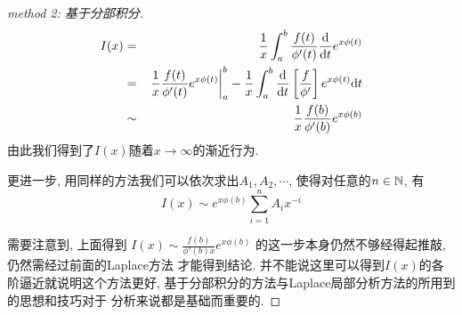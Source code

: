 \documentclass[a4paper,12pt]{article}
\begin{document}
  \begin{proof}[method 2: 基于分部积分]
    \begin{eqnarray*}
      I(x)&=&\frac{1}{x}\int_a^b\frac{f(t)}{\phi'(t)}\frac{\mathrm{d}}{\mathrm{d} t}e^{x\phi(t)}\\
      &=&\left.\frac{1}{x}\frac{f(t)}{\phi'(t)}e^{x\phi(t)}\right\vert_a^b
      -\frac{1}{x}\int_a^b\frac{\mathrm{d}}{\mathrm{d} t}\left[\frac{f}{\phi'}\right]e^{x\phi(t)}\mathrm{d} t\\
      &\sim&\frac{1}{x}\frac{f(b)}{\phi'(b)}e^{x\phi(b)}
    \end{eqnarray*}
    由此我们得到了$I(x)$随着$x\to\infty$的渐近行为.

    更进一步, 用同样的方法我们可以依次求出$A_1,A_2,\cdots$, 
    使得对任意的$n\in\mathbb{N}$, 有
    \[I(x)\sim e^{x\phi(b)}\sum_{i=1}^{n}A_ix^{-i}\]

    需要注意到, 上面得到
    $I(x)\sim \frac{f(b)}{\phi'(b)x}e^{x\phi(b)}$
    的这一步本身仍然不够经得起推敲, 仍然需经过前面的Laplace方法
    才能得到结论. 并不能说这里可以得到$I(x)$的各阶逼近就说明这个方法更好, 
    基于分部积分的方法与Laplace局部分析方法的所用到的思想和技巧对于
    分析来说都是基础而重要的.
  \end{proof}



%

%
\end{document}
